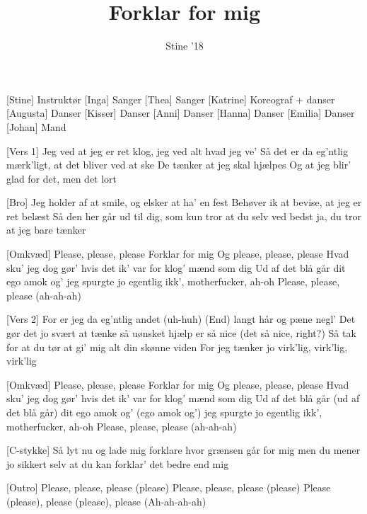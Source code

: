 \documentclass[a4paper,11pt]{article}
\title{Forklar for mig}
\author{Stine '18}
\begin{document}
\maketitle

\begin{roles}
[Stine] Instruktør
[Inga] Sanger
[Thea] Sanger
[Katrine] Koreograf + danser
[Augusta] Danser
[Kisser] Danser
[Anni] Danser
[Hanna] Danser
[Emilia] Danser
[Johan] Mand
\end{roles}

\begin{song}
[Vers 1] Jeg ved at jeg er ret klog, 
jeg ved alt hvad jeg ve’ 
Så det er da eg’ntlig mærk’ligt, 
at det bliver ved at ske
De tænker at jeg skal hjælpes
Og at jeg blir’ glad for det,
men det lort


[Bro] Jeg holder af at smile, 
og elsker at ha’ en fest
Behøver ik at bevise, 
at jeg er ret belæst
Så den her går ud til dig, som 
kun tror at du selv ved bedst
ja, du tror
at jeg bare tænker

[Omkvæd] Please, please, please
Forklar for mig
Og please, please, please
Hvad sku’ jeg dog gør’ hvis det ik’ var for klog’ mænd som dig
Ud af det blå går
dit ego amok og’
jeg spurgte jo egentlig ikk’,
motherfucker, ah-oh
Please, please, please (ah-ah-ah)

[Vers 2] For er jeg da eg’ntlig andet (uh-huh)
(End) langt hår og pæne negl’
Det gør det jo svært at tænke
så uønsket hjælp er så nice (det så nice, right?)
Så tak for at du tør at gi’
mig alt din skønne viden
For jeg tænker jo virk’lig, virk’lig, virk’lig


[Omkvæd] Please, please, please 
Forklar for mig
Og please, please, please
Hvad sku’ jeg dog gør’ hvis det ik’ var for klog’ mænd som dig
Ud af det blå går (ud af det blå går)
dit ego amok og’ (ego amok og’)
jeg spurgte jo egentlig ikk’,
motherfucker, ah-oh
Please, please, please (ah-ah-ah)

[C-stykke] Så lyt nu og lade mig forklare hvor grænsen går for mig 
men du mener jo sikkert selv at du 
kan forklar’ det bedre end mig

[Outro] Please, please, please (please)
Please, please, please (please)
Please (please), please (please), please
(Ah-ah-ah-ah)



\end{song}
\end{document}
